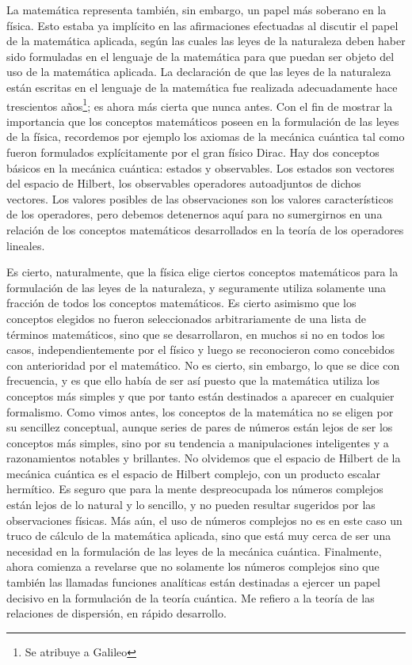 \documentclass[a4paper, 12pt]{article}
\begin{document}
 

La matemática representa también, sin embargo, un papel más soberano en la física. Esto estaba ya implícito en las afirmaciones efectuadas al discutir el papel de la matemática aplicada, según las cuales las leyes de la naturaleza deben haber sido formuladas en el lenguaje de la matemática para que puedan ser objeto del uso de la matemática aplicada. La declaración de que las leyes de la naturaleza están escritas en el lenguaje de la matemática fue realizada adecuadamente hace trescientos años\footnote{Se atribuye a Galileo}; es ahora más cierta que nunca antes. Con el fin de mostrar la importancia que los conceptos matemáticos poseen en la formulación de las leyes de la física, recordemos por ejemplo los axiomas de la mecánica cuántica tal como fueron formulados explícitamente por el gran físico Dirac. Hay dos conceptos básicos en la mecánica cuántica: estados y observables. Los estados son vectores del espacio de Hilbert, los observables operadores autoadjuntos de dichos vectores. Los valores posibles de las observaciones son los valores característicos de los operadores, pero debemos detenernos aquí para no sumergirnos en una relación de los conceptos matemáticos desarrollados en la teoría de los operadores lineales.

Es cierto, naturalmente, que la física elige ciertos conceptos matemáticos para la formulación de las leyes de la naturaleza, y seguramente utiliza solamente una fracción de todos los conceptos matemáticos. Es cierto asimismo que los conceptos elegidos no fueron seleccionados arbitrariamente de una lista de términos matemáticos, sino que se desarrollaron, en muchos si no en todos los casos, independientemente por el físico y luego se reconocieron como concebidos con anterioridad por el matemático. No es cierto, sin embargo, lo que se dice con frecuencia, y es que ello había de ser así puesto que la matemática utiliza los conceptos más simples y que por tanto están destinados a aparecer en cualquier formalismo. Como vimos antes, los conceptos de la matemática no se eligen por su sencillez conceptual, aunque series de pares de números están lejos de ser los conceptos más simples, sino por su tendencia a manipulaciones inteligentes y a razonamientos notables y brillantes. No olvidemos que el espacio de Hilbert de la mecánica cuántica es el espacio de Hilbert complejo, con un producto escalar hermítico. Es seguro que para la mente despreocupada los números complejos están lejos de lo natural y lo sencillo, y no pueden resultar sugeridos por las observaciones físicas. Más aún, el uso de números complejos no es en este caso un truco de cálculo de la matemática aplicada, sino que está muy cerca de ser una necesidad en la formulación de las leyes de la mecánica cuántica. Finalmente, ahora comienza a revelarse que no solamente los números complejos sino que también las llamadas funciones analíticas están destinadas a ejercer un papel decisivo en la formulación de la teoría cuántica. Me refiero a la teoría de las relaciones de dispersión, en rápido desarrollo.
\end{document}
